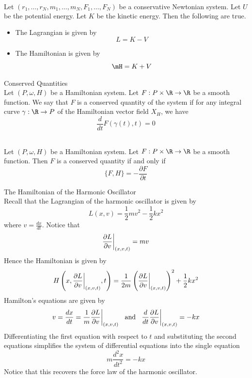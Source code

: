 \documentclass[a4paper]{article}
\begin{document}
\begin{crl}{}{}\\
Let $(r_1,\dots,r_N,m_1,\dots,m_N,F_1,\dots,F_N)$ be a conservative Newtonian system. Let $U$ be the potential energy. Let $K$ be the kinetic energy. Then the following are true. 
\begin{itemize}
\item The Lagrangian is given by $$L=K-V$$
\item The Hamiltonian is given by $$\mH=K+V$$
\end{itemize}
\end{crl}

\begin{defn}{Conserved Quantities}{}\\
Let $(P,\omega,H)$ be a Hamiltonian system. Let $F:P\times\R\to\R$ be a smooth function. We say that $F$ is a conserved quantity of the system if for any integral curve $\gamma:\R\to P$ of the Hamiltonian vector field $X_H$, we have $$\frac{d}{dt}F(\gamma(t),t)=0$$
\end{defn}

\begin{prp}{}{}\\
Let $(P,\omega,H)$ be a Hamiltonian system. Let $F:P\times\R\to\R$ be a smooth function. Then $F$ is a conserved quantity if and only if $$\{F,H\}=-\frac{\partial F}{\partial t}$$
\end{prp}

\begin{eg}{The Hamiltonian of the Harmonic Oscillator}{}\\
Recall that the Lagrangian of the harmonic oscillator is given by $$L(x,v)=\frac{1}{2}mv^2-\frac{1}{2}kx^2$$ where $v=\frac{dx}{dt}$. Notice that $$\frac{\partial L}{\partial v}\bigg{|}_{(x,v,t)}=mv$$ Hence the Hamiltonian is given by $$H\left(x,\frac{\partial L}{\partial v}\bigg{|}_{(x,v,t)},t\right)=\frac{1}{2m}\left(\frac{\partial L}{\partial v}\bigg{|}_{(x,v,t)}\right)^2+\frac{1}{2}kx^2$$ Hamilton's equations are given by $$v=\frac{dx}{dt}=\frac{1}{m}\frac{\partial L}{\partial v}\bigg{|}_{(x,v,t)}\;\;\text{ and }\;\;\frac{d}{dt}\frac{\partial L}{\partial v}\bigg{|}_{(x,v,t)}=-kx$$ Differentiating the first equation with respect to $t$ and substituting the second equations simplifies the system of differential equations into the single equation $$m\frac{d^2x}{dt^2}=-kx$$ Notice that this recovers the force law of the harmonic oscillator. 
\end{eg}
\end{document}
